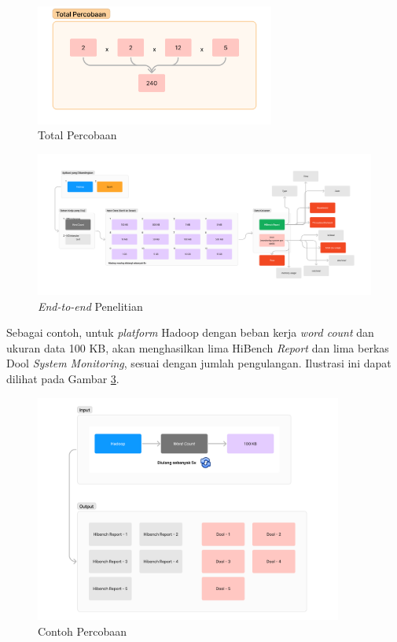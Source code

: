 \begin{figure}[h]
    \centering
    \includegraphics[width=0.7\textwidth]{figures/ch03/total-percobaan.png}
    \caption{Total Percobaan}
    \label{fig:total-percobaan}
\end{figure}

\begin{landscape}
\begin{figure}[h]
    \centering
    \includegraphics[width=\linewidth, height=0.5\linewidth]{figures/ch03/flow-penelitian-umum.png}
    \caption{\textit{End-to-end} Penelitian}
    \label{fig:flow-penelitian-umum}
\end{figure}
\end{landscape}

Sebagai contoh, untuk \textit{platform} Hadoop dengan beban kerja \textit{word count} dan ukuran data 100 KB, akan menghasilkan lima HiBench \textit{Report} dan lima berkas Dool \textit{System Monitoring}, sesuai dengan jumlah pengulangan.  Ilustrasi ini dapat dilihat pada Gambar \ref{fig:contoh-percobaan}.

\begin{figure}[h]
    \centering
    \includegraphics[width=0.9\textwidth]{figures/ch03/contoh-percobaan.png}
    \caption{Contoh Percobaan}
    \label{fig:contoh-percobaan}
\end{figure}

